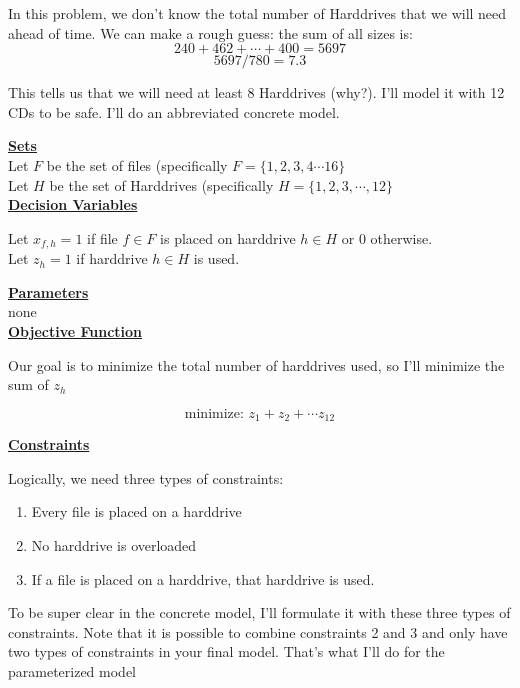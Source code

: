 \documentclass[11pt]{article}
\theoremstyle{definition}
\newcommand{\blu}{\color{blue}}
\begin{document}
{
\blu

In this problem, we don't know the total number of Harddrives that we will need ahead of time. We can make a rough guess: the sum of all sizes is:
\[
240+462+\cdots + 400 = 5697 
\]
\[
5697 / 780 = 7.3
\]

This tells us that we will need at least 8 Harddrives (why?). I'll model it with 12 CDs to be safe. I'll do an abbreviated concrete model.

\textbf{\underline{Sets}} \\

Let $F$ be the set of files (specifically $F = \{1, 2, 3, 4 \cdots 16\}$ \\
Let $H$ be the set of Harddrives (specifically $H = \{1, 2, 3 , \cdots, 12 \}$ \\


\textbf{\underline{Decision Variables}}

Let $x_{f,h} = 1$ if file $f \in F$ is placed on harddrive $h \in H$ or $0$ otherwise. \\
Let $z_h = 1$ if harddrive $h \in H$ is used.

\textbf{\underline{Parameters}} \\
none \\

\textbf{\underline{Objective Function}}

Our goal is to minimize the total number of harddrives used, so I'll minimize the sum of $z_h$

\[
\text{minimize: } z_1 + z_2 + \cdots z_{12}
\]

\textbf{\underline{Constraints}}

Logically, we need three types of constraints:
	\begin{enumerate}
	\item Every file is placed on a harddrive
	\item No harddrive is overloaded
	\item If a file is placed on a harddrive, that harddrive is used.
	\end{enumerate}

To be super clear in the concrete model, I'll formulate it with these three types of constraints. Note that it is possible to combine constraints 2 and 3 and only have two types of constraints in your final model. That's what I'll do for the parameterized model

}
\end{document}
